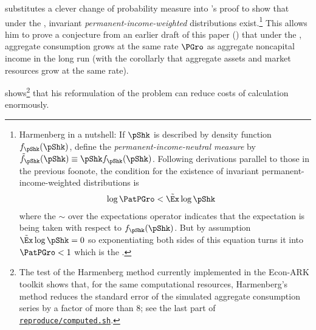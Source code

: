 \documentclass[ProjectDLO]{subfiles}
\begin{document}
\hypertarget{Growth-Rates-of-Aggregate-Income-and-Consumption}{}

\cite{harmenbergInvariant} substitutes a clever change of probability measure into \cite{szeidlInvariant}'s proof to show that under the {\GIC}, invariant \emph{permanent-income-weighted} distributions exist.\footnote{Harmenberg in a nutshell:  If $\pShk$ is described by density function $f_\pShk(\pShk)$, define the \emph{permanent-income-neutral measure} by $\Harm{f}_\pShk(\pShk) \equiv \pShk f_\pShk(\pShk)$.  Following derivations parallel to those in the previous foonote, the condition for the existence of invariant permanent-income-weighted distributions is
  \begin{align*}
\log \PatPGro  & < \Harm{\Ex} \log \pShk
  \end{align*}
  where the $\sim$ over the expectations operator indicates that the expectation is being taken with respect to $f_\pShk(\pShk)$.  But by assumption $\Harm{\Ex} \log \pShk = 0$ so exponentiating both sides of this equation turns it into $\PatPGro < 1$ which is the {\GIC}.}  This allows him to prove a conjecture from an earlier draft of this paper (\cite{BufferStockTheoryQESubmit}) that under the {\GIC}, aggregate consumption grows at the same rate $\PGro$ as aggregate noncapital income in the long run (with the corollarly that aggregate assets and market resources grow at the same rate).


\cite{harmenbergInvariant} shows\footnote{The test of the Harmenberg method currently implemented in the Econ-ARK toolkit shows that, for the same computational resources, Harmenberg's method reduces the standard error of the simulated aggregate consumption series by a factor of more than 8; see the last part of \href{https://github.com/econ-ark/BufferStockTheory/blob/master/reproduce/computed.sh}{\texttt{reproduce/computed.sh}}.} that his reformulation of the problem can reduce costs of calculation enormously.  %
\end{document}

